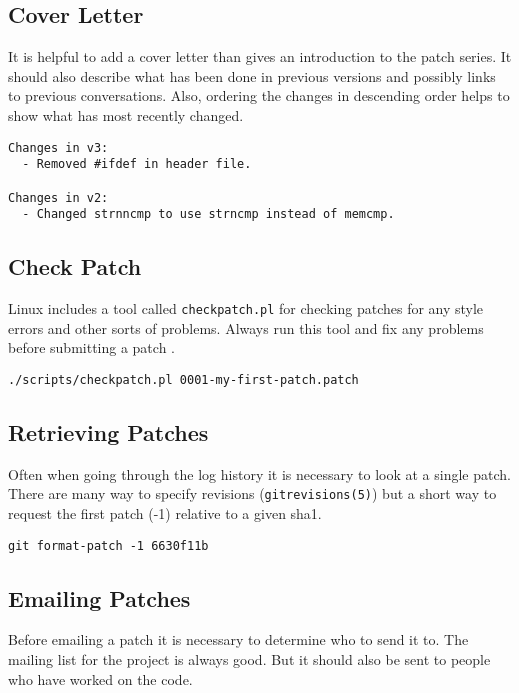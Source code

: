 \documentclass{article}
\begin{document}
\subsection{Cover Letter}

It is helpful to add a cover letter than gives an introduction to the
patch series.  It should also describe what has been done in previous
versions and possibly links to previous conversations.  Also, ordering
the changes in descending order helps to show what has most recently
changed.

\begin{verbatim}
Changes in v3:
  - Removed #ifdef in header file.
    
Changes in v2:
  - Changed strnncmp to use strncmp instead of memcmp.
\end{verbatim}

\subsection{Check Patch}

Linux includes a tool called \verb+checkpatch.pl+ for checking patches for
any style errors and other sorts of problems.  Always run this tool and
fix any problems before submitting a patch \autocite{firstpatch}\autocite{CodingStyle}.

\begin{verbatim}
./scripts/checkpatch.pl 0001-my-first-patch.patch
\end{verbatim}

\subsection{Retrieving Patches}

Often when going through the log history it is necessary to look at a
single patch.  There are many way to specify revisions (\verb+gitrevisions(5)+) but
a short way to request the first patch (-1) relative to a given sha1.

\begin{verbatim}
git format-patch -1 6630f11b
\end{verbatim}

\subsection{Emailing Patches}

Before emailing a patch it is necessary to determine who to send it to.
The mailing list for the project is always good.
But it should also be sent to people who have worked on the code.
\end{document}
